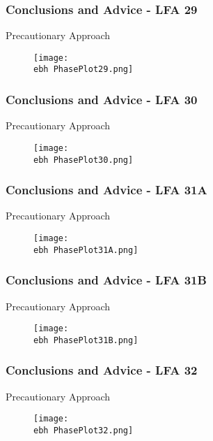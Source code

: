 \documentclass{beamer}
\newcommand{\ebh}{\string~/bio.data/bio.lobster/figures/Assessment/LFA2732/} %
\begin{document}
\begin{frame}
\frametitle{Conclusions and Advice - LFA 29}
Precautionary Approach
\begin{figure}
        \begin{center}
            \texttt{[image: \\ebh PhasePlot29.png]}
        \end{center}
    \end{figure}
\end{frame}




\begin{frame}
\frametitle{Conclusions and Advice - LFA 30}
Precautionary Approach
\begin{figure}
        \begin{center}
            \texttt{[image: \\ebh PhasePlot30.png]}
        \end{center}
    \end{figure}
\end{frame}




\begin{frame}
\frametitle{Conclusions and Advice - LFA 31A}
Precautionary Approach
\begin{figure}
        \begin{center}
            \texttt{[image: \\ebh PhasePlot31A.png]}
        \end{center}
    \end{figure}
\end{frame}




\begin{frame}
\frametitle{Conclusions and Advice - LFA 31B}
Precautionary Approach
\begin{figure}
        \begin{center}
            \texttt{[image: \\ebh PhasePlot31B.png]}
        \end{center}
    \end{figure}
\end{frame}




\begin{frame}
\frametitle{Conclusions and Advice - LFA 32}
Precautionary Approach
\begin{figure}
        \begin{center}
            \texttt{[image: \\ebh PhasePlot32.png]}
        \end{center}
    \end{figure}
\end{frame}
\end{document}
